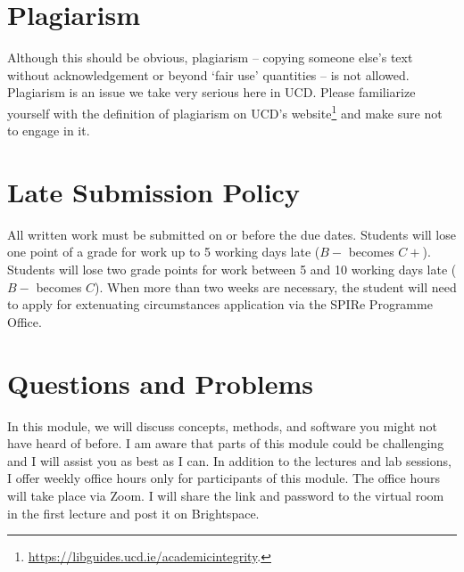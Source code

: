 \documentclass[abstract=on,parskip=full,headings=standardclasses,fontsize=11pt,paper=a4]{scrartcl}
\begin{document}
\section*{Plagiarism}

Although this should be obvious, plagiarism -- copying someone else's text without acknowledgement or beyond `fair use' quantities -- is not allowed. Plagiarism is an issue we take very serious here in UCD. Please familiarize yourself with the definition of plagiarism on UCD's website\footnote{\url{https://libguides.ucd.ie/academicintegrity}.} and make sure not to engage in it.



\section*{Late Submission Policy}

All written work must be submitted on or before the due dates. Students will lose one point of a grade for work up to 5 working days late ($B-$ becomes $C+$). Students will lose two grade points for work between 5 and 10 working days late ($B-$ becomes $C$). When more than two weeks are necessary, the student will need to apply for extenuating circumstances application via the SPIRe Programme Office.


\section*{Questions and Problems}

In this module, we will discuss concepts, methods, and software you might not have heard of before. I am  aware that parts of this module could be challenging and I will assist you as best as I can. In addition to the lectures and lab sessions, I  offer weekly office hours only  for  participants of this module. The office hours will take place via Zoom. I will share the link and password to the virtual room in the first lecture and post it on Brightspace. 
\end{document}
